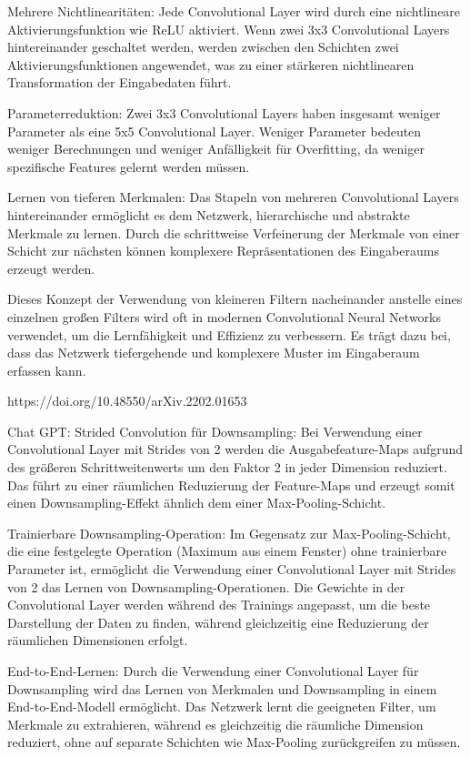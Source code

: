 \documentclass[
fontsize=12pt,					%
paper=a4,						%
twoside=true, 					%
listof=totoc, 					%
bibliography=totoc,				%
titlepage, 						%
headsepline, 					%
DIV=12,							%
BCOR=6mm,						%
cleardoublepage=empty,			%
parskip,							%
ngerman
]{scrartcl}
\begin{document}
Mehrere Nichtlinearitäten: Jede Convolutional Layer wird durch eine nichtlineare Aktivierungsfunktion wie ReLU aktiviert. Wenn zwei 3x3 Convolutional Layers hintereinander geschaltet werden, werden zwischen den Schichten zwei Aktivierungsfunktionen angewendet, was zu einer stärkeren nichtlinearen Transformation der Eingabedaten führt.

Parameterreduktion: Zwei 3x3 Convolutional Layers haben insgesamt weniger Parameter als eine 5x5 Convolutional Layer. Weniger Parameter bedeuten weniger Berechnungen und weniger Anfälligkeit für Overfitting, da weniger spezifische Features gelernt werden müssen.

Lernen von tieferen Merkmalen: Das Stapeln von mehreren Convolutional Layers hintereinander ermöglicht es dem Netzwerk, hierarchische und abstrakte Merkmale zu lernen. Durch die schrittweise Verfeinerung der Merkmale von einer Schicht zur nächsten können komplexere Repräsentationen des Eingaberaums erzeugt werden.

Dieses Konzept der Verwendung von kleineren Filtern nacheinander anstelle eines einzelnen großen Filters wird oft in modernen Convolutional Neural Networks verwendet, um die Lernfähigkeit und Effizienz zu verbessern. Es trägt dazu bei, dass das Netzwerk tiefergehende und komplexere Muster im Eingaberaum erfassen kann.



https://doi.org/10.48550/arXiv.2202.01653 

Chat GPT:
Strided Convolution für Downsampling: Bei Verwendung einer Convolutional Layer mit Strides von 2 werden die Ausgabefeature-Maps aufgrund des größeren Schrittweitenwerts um den Faktor 2 in jeder Dimension reduziert. Das führt zu einer räumlichen Reduzierung der Feature-Maps und erzeugt somit einen Downsampling-Effekt ähnlich dem einer Max-Pooling-Schicht.

Trainierbare Downsampling-Operation: Im Gegensatz zur Max-Pooling-Schicht, die eine festgelegte Operation (Maximum aus einem Fenster) ohne trainierbare Parameter ist, ermöglicht die Verwendung einer Convolutional Layer mit Strides von 2 das Lernen von Downsampling-Operationen. Die Gewichte in der Convolutional Layer werden während des Trainings angepasst, um die beste Darstellung der Daten zu finden, während gleichzeitig eine Reduzierung der räumlichen Dimensionen erfolgt.

End-to-End-Lernen: Durch die Verwendung einer Convolutional Layer für Downsampling wird das Lernen von Merkmalen und Downsampling in einem End-to-End-Modell ermöglicht. Das Netzwerk lernt die geeigneten Filter, um Merkmale zu extrahieren, während es gleichzeitig die räumliche Dimension reduziert, ohne auf separate Schichten wie Max-Pooling zurückgreifen zu müssen.
\end{document}
